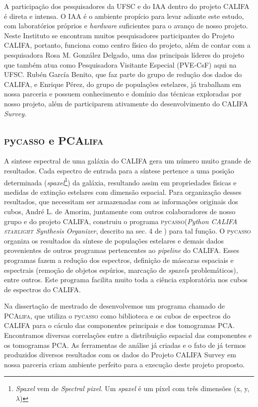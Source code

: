 \documentclass[a4paper,12pt]{article}
\newcommand\pycasso{\textsc{p}y\textsc{casso}\xspace}
\newcommand\pcalifa{PCA\textsc{lifa}\xspace}
\def\starlight{\textsc{starlight}\xspace}      %
\begin{document}
A participação dos pesquisadores da UFSC e do IAA dentro do projeto CALIFA é direta e intensa. O IAA
é o ambiente propício para levar adiante este estudo, com laboratórios próprios e {\em hardware}
suficientes para o avanço de nosso projeto. Neste Instituto se encontram muitos pesquisadores
participantes do Projeto CALIFA, portanto, funciona como centro físico do projeto, além de contar
com a pesquisadora Rosa M. González Delgado, uma das principais líderes do projeto que também atua
como Pesquisadora Visitante Especial (PVE-CsF) aqui na UFSC. Rubén García Benito, que faz parte do
grupo de redução dos dados do CALIFA, e Enrique Pérez, do grupo de populações estelares, já
trabalham em nossa parceria e possuem conhecimento e domínio das técnicas exploradas por nosso
projeto, além de participarem ativamente do desenvolvimento do CALIFA {\em Survey}.

\subsection{\pycasso e \pcalifa}
\vspace{0.3cm}
A sintese espectral de uma galáxia do CALIFA gera um número muito grande de resultados. Cada
espectro de entrada para a síntese pertence a uma posição determinada ({\em spaxel}\footnote{{\em
Spaxel} vem de {\em Spectral pixel}. Um {\em spaxel} é um píxel com três dimensões (x, y,
$\lambda$)}) da galáxia, resultando assim em propriedades físicas e medidas de extinção estelares
com dimensão espacial. Para organização desses resultados, que necessitam ser armazenadas com as
informações originais dos cubos, André L. de Amorim, juntamente com outros colaboradores de nosso
grupo e do projeto CALIFA, construiu o programa \pycasso ({\em Python CALIFA \starlight Synthesis
Organizer}, descrito na sec. 4 de \citet{CidFernandes.etal.2013a}) para tal função. O \pycasso
organiza os resultados da síntese de populações estelares e demais dados provenientes de outros
programas pertencentes ao {\em pipeline} do CALIFA. Esses programas fazem a redução dos espectros,
definição de máscaras espaciais e espectrais (remoção de objetos espúrios, marcação de {\em spaxels}
problemáticos), entre outros. Este programa facilita muito toda a ciência exploratória nos cubos de
espectros do CALIFA.

Na dissertação de mestrado de \citet{Lacerda2014} desenvolvemos um programa chamado de \pcalifa, que
utiliza o \pycasso como biblioteca e os cubos de espectros do CALIFA para o cáculo das componentes
principais e dos tomogramas PCA. Encontramos diversas correlações entre a distribuição espacial das
componentes e os tomogramas PCA. As ferramentas de análise já criadas e o fato de já termos
produzidos diversos resultados com os dados do Projeto CALIFA Survey em nossa parceria criam
ambiente perfeito para a execução deste projeto proposto.
\end{document}
